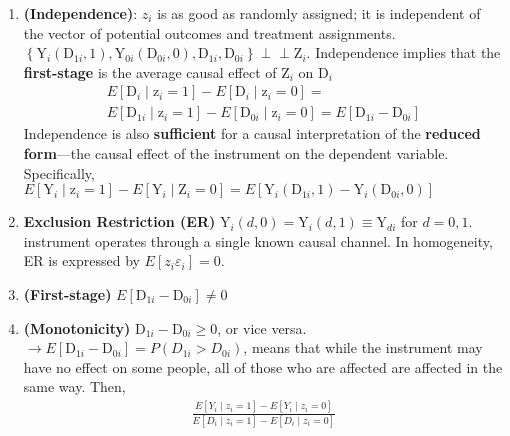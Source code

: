 \documentclass[
]{article}
\begin{document}
\begin{enumerate}
\def\labelenumi{\arabic{enumi}.}
\item
  \textbf{(Independence)}: \(z_{i}\) is as good as randomly assigned; it
  is independent of the vector of potential outcomes and treatment
  assignments.
  \(\left\{\mathrm{Y}_{i}\left(\mathrm{D}_{1 i}, 1\right), \mathrm{Y}_{0 i}\left(\mathrm{D}_{0 i}, 0\right), \mathrm{D}_{1 i}, \mathrm{D}_{0 i}\right\} \perp \perp \mathrm{Z}_{i}.\)
  Independence implies that the \textbf{first-stage} is the average
  causal effect of \(\mathrm{Z}_{i}\) on \(\mathrm{D}_{i}\) \[
  \begin{aligned}
  E\left[\mathrm{D}_{i} \mid \mathrm{z}_{i}=1\right]-E\left[\mathrm{D}_{i} \mid \mathrm{z}_{i}=0\right] = \\ E\left[\mathrm{D}_{1 i} \mid \mathrm{z}_{i}=1\right]-E\left[\mathrm{D}_{0 i} \mid \mathrm{z}_{i}=0\right]
  =E\left[\mathrm{D}_{1 i}-\mathrm{D}_{0 i}\right]
  \end{aligned}
  \] Independence is also \textbf{sufficient} for a causal
  interpretation of the \textbf{reduced form}---the causal effect of the
  instrument on the dependent variable. Specifically,
  \(E\left[\mathrm{Y}_{i} \mid \mathrm{z}_{i}=1\right]-E\left[\mathrm{Y}_{i} \mid \mathrm{Z}_{i}=0\right]=E\left[\mathrm{Y}_{i}\left(\mathrm{D}_{1 i}, 1\right)-\mathrm{Y}_{i}\left(\mathrm{D}_{0 i}, 0\right)\right]\)
\item
  \textbf{Exclusion Restriction (ER)}
  \(\mathrm{Y}_{i}(d, 0)=\mathrm{Y}_{i}(d, 1) \equiv \mathrm{Y}_{d i}\)
  for \(d=0,1\). instrument operates through a single known causal
  channel. In homogeneity, ER is expressed by
  \(E[z_i\varepsilon_i] = 0\).
\item
  \textbf{(First-stage)}
  \(E\left[\mathrm{D}_{1 i}-\mathrm{D}_{0 i}\right] \neq 0\)
\item
  \textbf{(Monotonicity)} \(\mathrm{D}_{1 i}-\mathrm{D}_{0 i} \geq 0\),
  or vice versa.
  \(\rightarrow E[\mathrm{D}_{1 i}-\mathrm{D}_{0 i}]=P(D_{1i}>D_{0i})\),
  means that while the instrument may have no effect on some people, all
  of those who are affected are affected in the same way. Then, \[
  \begin{aligned}
  \frac{E\left[Y_{i} \mid z_{i}=1\right]-E\left[Y_{i} \mid z_{i}=0\right]}{E\left[D_{i} \mid z_{i}=1\right]-E\left[D_{i} \mid z_{i}=0\right]}
  \end{aligned}
      \]
\end{enumerate}
\end{document}
